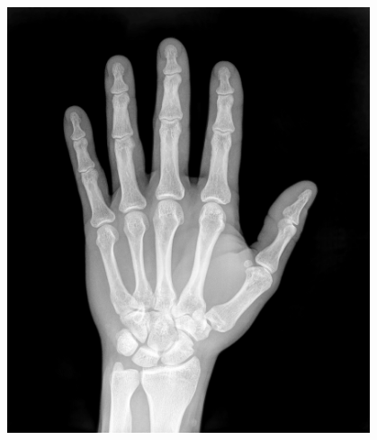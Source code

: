 \begin{minipage}{.5\textwidth}\begin{center}
 \includegraphics[width=0.8\textwidth]{photos/x-ray-hand_TraceMeek_flickr.jpg}\end{center}
\end{minipage}

